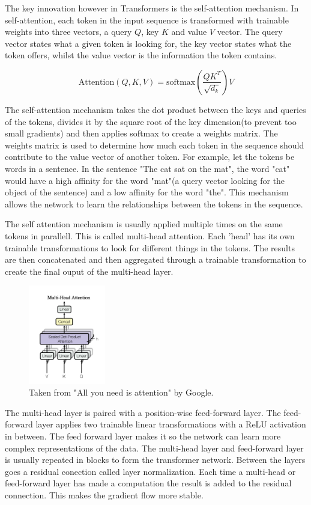 \documentclass[11pt]{article}
\begin{document}
The key innovation however in Transformers is the self-attention mechanism. In self-attention, each token in the input sequence is transformed with trainable weights into three vectors, a query $Q$, key $K$ and value $V$ vector. The query vector states what a given token is looking for, the key vector states what the token offers, whilst the value vector is the information the token contains.

$$\text{Attention}(Q, K , V) = \text{softmax}(\frac{QK^T}{\sqrt{d_k}})V$$

The self-attention mechanism takes the dot product between the keys and queries of the tokens, divides it by the square root of the key dimension(to prevent too small gradients) and then applies softmax to create a weights matrix. The weights matrix is used to determine how much each token in the sequence should contribute to the value vector of another token. For example, let the tokens be words in a sentence. In the sentence "The cat sat on the mat", the word "cat" would have a high affinity for the word "mat"(a query vector looking for the object of the sentence) and a low affinity for the word "the". This mechanism allows the network to learn the relationships between the tokens in the sequence.

The self attention mechanism is usually applied multiple times on the same tokens in parallell. This is called multi-head attention. Each 'head' has its own trainable transformations to look for different things in the tokens. The results are then concatenated and then aggregated through a trainable transformation to create the final ouput of the multi-head layer.

\begin{figure}[h]
\centering
\includegraphics[width=0.3\textwidth]{multi-head.png}
\caption{Taken from "All you need is attention" by Google. }
\end{figure}

The multi-head layer is paired with a position-wise feed-forward layer. The feed-forward layer applies two trainable linear transformations with a ReLU activation in between. The feed forward layer makes it so the network can learn more complex representations of the data. The multi-head layer and feed-forward layer is usually repeated in blocks to form the transformer network. Between the layers goes a residual conection called layer normalization. Each time a multi-head or feed-forward layer has made a computation the result is added to the residual connection. This makes the gradient flow more stable.
\end{document}
